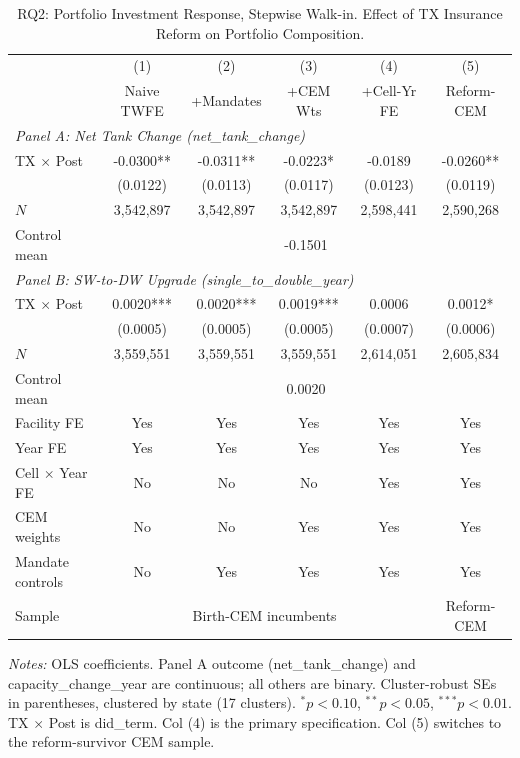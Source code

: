 \begin{table}[htbp]
\centering
\caption{RQ2: Portfolio Investment Response, Stepwise Walk-in. Effect of TX Insurance Reform on Portfolio Composition.}
\label{tab:rq2_stepwise}
\begin{tabular}{lccccc}
\toprule
 & (1) & (2) & (3) & (4) & (5) \\
 & Naive TWFE & +Mandates & +CEM Wts & +Cell-Yr FE & Reform-CEM \\
\midrule
\multicolumn{6}{l}{\textit{Panel A: Net Tank Change (net\_tank\_change)}} \\[0.3em]
TX $\times$ Post & -0.0300** & -0.0311** & -0.0223* & -0.0189 & -0.0260** \\
& (0.0122) & (0.0113) & (0.0117) & (0.0123) & (0.0119) \\
$N$ & 3,542,897 & 3,542,897 & 3,542,897 & 2,598,441 & 2,590,268 \\
Control mean & \multicolumn{5}{c}{-0.1501} \\
\midrule
\multicolumn{6}{l}{\textit{Panel B: SW-to-DW Upgrade (single\_to\_double\_year)}} \\[0.3em]
TX $\times$ Post & 0.0020*** & 0.0020*** & 0.0019*** & 0.0006 & 0.0012* \\
& (0.0005) & (0.0005) & (0.0005) & (0.0007) & (0.0006) \\
$N$ & 3,559,551 & 3,559,551 & 3,559,551 & 2,614,051 & 2,605,834 \\
Control mean & \multicolumn{5}{c}{0.0020} \\
\midrule
Facility FE         & Yes & Yes & Yes & Yes & Yes \\
Year FE             & Yes & Yes & Yes & Yes & Yes \\
Cell $\times$ Year FE & No & No & No & Yes & Yes \\
CEM weights         & No & No & Yes & Yes & Yes \\
Mandate controls    & No & Yes & Yes & Yes & Yes \\
Sample              & \multicolumn{4}{c}{Birth-CEM incumbents} & Reform-CEM \\
\bottomrule
\end{tabular}
\begin{minipage}{\linewidth}
\small
\textit{Notes:} OLS coefficients. Panel A outcome (net\_tank\_change) and capacity\_change\_year are continuous; all others are binary. Cluster-robust SEs in parentheses, clustered by state (17 clusters). $^{*}p<0.10$, $^{**}p<0.05$, $^{***}p<0.01$. TX $\times$ Post is did\_term. Col (4) is the primary specification. Col (5) switches to the reform-survivor CEM sample.
\end{minipage}
\end{table}
